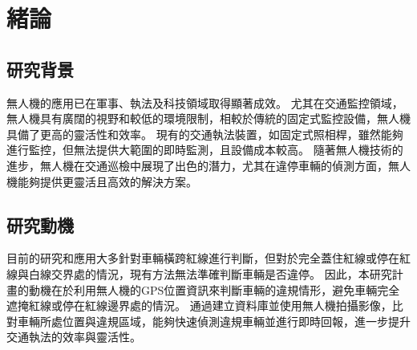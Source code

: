 \documentclass[12pt]{article}       %
\begin{document}
\newpage  %


\begin{center}
\tableofcontents  %
\thispagestyle{empty}  %
\end{center}
\newpage  %


\setcounter{page}{1}  %


\section{\centering 緒論}

\subsection{研究背景} 
\hspace{2em}無人機的應用已在軍事、執法及科技領域取得顯著成效。
尤其在交通監控領域，無人機具有廣闊的視野和較低的環境限制，相較於傳統的固定式監控設備，無人機具備了更高的靈活性和效率。
現有的交通執法裝置，如固定式照相桿，雖然能夠進行監控，但無法提供大範圍的即時監測，且設備成本較高。
隨著無人機技術的進步，無人機在交通巡檢中展現了出色的潛力，尤其在違停車輛的偵測方面，無人機能夠提供更靈活且高效的解決方案。


\subsection{研究動機} 
\hspace{2em}目前的研究和應用大多針對車輛橫跨紅線進行判斷，但對於完全蓋住紅線或停在紅線與白線交界處的情況，現有方法無法準確判斷車輛是否違停。
因此，本研究計畫的動機在於利用無人機的GPS位置資訊來判斷車輛的違規情形，避免車輛完全遮掩紅線或停在紅線邊界處的情況。
通過建立資料庫並使用無人機拍攝影像，比對車輛所處位置與違規區域，能夠快速偵測違規車輛並進行即時回報，進一步提升交通執法的效率與靈活性。
\end{document}
